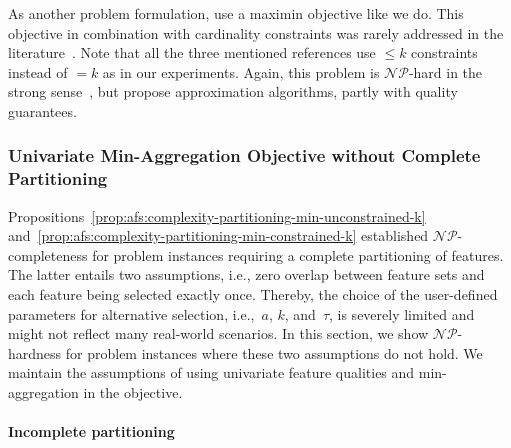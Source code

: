\documentclass{article}
\theoremstyle{definition}
\begin{document}
As another problem formulation, \cite{chen20023partitioning, he2003kappa, lawrinenko2018reduction} use a maximin objective like we do.
This objective in combination with cardinality constraints was rarely addressed in the literature~\cite{lawrinenko2018reduction}.
Note that all the three mentioned references use $\leq k$ constraints instead of $= k$ as in our experiments.
Again, this problem is $\mathcal{NP}$-hard in the strong sense~\cite{he2003kappa, lawrinenko2018reduction}, but \cite{chen20023partitioning, he2003kappa, lawrinenko2018reduction} propose approximation algorithms, partly with quality guarantees.

\subsubsection{Univariate Min-Aggregation Objective without Complete Partitioning}
\label{sec:afs:appendix:complexity:uni:min-no-partitioning}

Propositions~\ref{prop:afs:complexity-partitioning-min-unconstrained-k} and~\ref{prop:afs:complexity-partitioning-min-constrained-k} established $\mathcal{NP}$-completeness for problem instances requiring a complete partitioning of features.
The latter entails two assumptions, i.e., zero overlap between feature sets and each feature being selected exactly once.
Thereby, the choice of the user-defined parameters for alternative selection, i.e.,~$a$, $k$, and~$\tau$, is severely limited and might not reflect many real-world scenarios.
In this section, we show $\mathcal{NP}$-hardness for problem instances where these two assumptions do not hold.
We maintain the assumptions of using univariate feature qualities and min-aggregation in the objective.

\paragraph{Incomplete partitioning}
\end{document}

